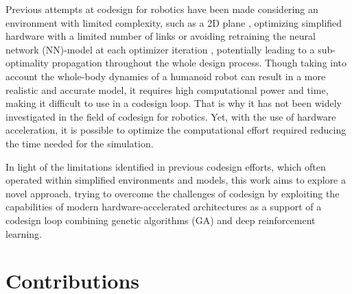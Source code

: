 Previous attempts at codesign  for robotics have been made considering an environment with limited complexity, such as a 2D plane \citep{ha_reinforcement_2019}, optimizing simplified hardware with a limited number of links \citep{chen_hardware_2020} or avoiding retraining the neural network (\ac{NN})-model at each optimizer iteration \citep{bjelonic_learning-based_2023}, potentially leading to a sub-optimality propagation  throughout the whole design process. Though taking into account the whole-body dynamics of a humanoid robot can result in a more realistic and accurate model, it requires high computational power and time, making it difficult to use in a codesign loop. That is why it has not been widely investigated in the field of codesign for robotics. Yet, with the use of hardware acceleration, it is possible to optimize the computational effort required reducing the time needed for the simulation. 

In light of the limitations identified in previous codesign efforts, which often operated within simplified environments and models, this work aims to explore a novel approach, trying to overcome the challenges of codesign   by exploiting the capabilities of modern hardware-accelerated architectures as a support of a codesign loop combining genetic algorithms (\ac{GA}) and deep reinforcement learning.



\section*{Contributions}

